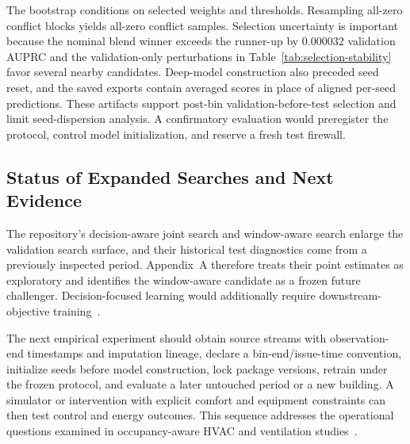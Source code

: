The bootstrap conditions on selected weights and thresholds. Resampling all-zero conflict blocks yields all-zero conflict samples. Selection uncertainty is important because the nominal blend winner exceeds the runner-up by 0.000032 validation AUPRC and the validation-only perturbations in Table~\ref{tab:selection-stability} favor several nearby candidates. Deep-model construction also preceded seed reset, and the saved exports contain averaged scores in place of aligned per-seed predictions. These artifacts support post-bin validation-before-test selection and limit seed-dispersion analysis. A confirmatory evaluation would preregister the protocol, control model initialization, and reserve a fresh test firewall.

\subsection{Status of Expanded Searches and Next Evidence}

The repository's decision-aware joint search and window-aware search enlarge the validation search surface, and their historical test diagnostics come from a previously inspected period. Appendix~A therefore treats their point estimates as exploratory and identifies the window-aware candidate as a frozen future challenger. Decision-focused learning would additionally require downstream-objective training~\cite{Wilder2019,ElmachtoubGrigas2022}.

The next empirical experiment should obtain source streams with observation-end timestamps and imputation lineage, declare a bin-end/issue-time convention, initialize seeds before model construction, lock package versions, retrain under the frozen protocol, and evaluate a later untouched period or a new building. A simulator or intervention with explicit comfort and equipment constraints can then test control and energy outcomes. This sequence addresses the operational questions examined in occupancy-aware HVAC and ventilation studies~\cite{Peng2018,Zhuang2022,Wietzke2024}.
